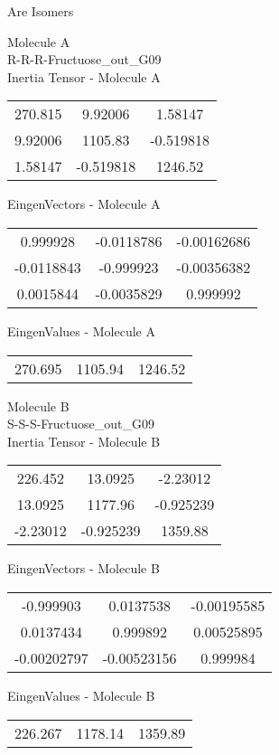 \begin{center}
\vtab
\vtab
\textcolor{NavyBlue}{\Large Are Isomers}
\end{center}
\newpage
\begin{multicols}{2}
\begin{center}
Molecule A \\ 
R-R-R-Fructuose\_out\_G09
\\
Inertia Tensor - Molecule A \\
\vtab
\begin{tabular}{|c c c|}
270.815	 & 	9.92006	 & 	1.58147	 \\
9.92006	 & 	1105.83	 & 	-0.519818	 \\
1.58147	 & 	-0.519818	 & 	1246.52
\end{tabular}

\vtab
 EingenVectors - Molecule A     \\
\vtab
\begin{tabular}{|c c c|}
0.999928	 & 	-0.0118786	 & 	-0.00162686	 \\
-0.0118843	 & 	-0.999923	 & 	-0.00356382	 \\
0.0015844	 & 	-0.0035829	 & 	0.999992
\end{tabular}

\vtab
 EingenValues - Molecule A     \\
\vtab
\begin{tabular}{|c c c|}
270.695	 & 	1105.94	 & 	1246.52
\end{tabular}
\columnbreak

Molecule B \\ 
S-S-S-Fructuose\_out\_G09
\\
Inertia Tensor - Molecule B \\
\vtab
\begin{tabular}{|c c c|}
226.452	 & 	13.0925	 & 	-2.23012	 \\
13.0925	 & 	1177.96	 & 	-0.925239	 \\
-2.23012	 & 	-0.925239	 & 	1359.88
\end{tabular}

\vtab
 EingenVectors - Molecule B     \\
\vtab
\begin{tabular}{|c c c|}
-0.999903	 & 	0.0137538	 & 	-0.00195585	 \\
0.0137434	 & 	0.999892	 & 	0.00525895	 \\
-0.00202797	 & 	-0.00523156	 & 	0.999984
\end{tabular}

\vtab
 EingenValues - Molecule B     \\
\vtab
\begin{tabular}{|c c c|}
226.267	 & 	1178.14	 & 	1359.89
\end{tabular}

\end{center}
\end{multicols}
